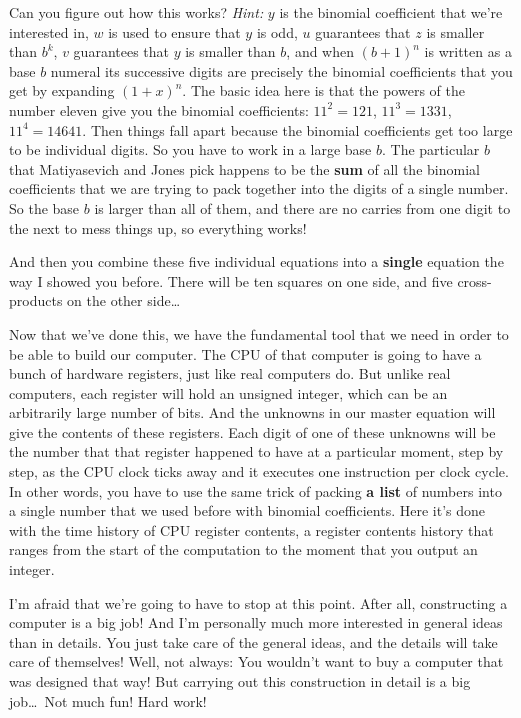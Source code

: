 \documentclass[12pt]{book}
\begin{document}
Can you figure out how this works? 
\emph{Hint:} $y$ is the binomial coefficient that we're interested in, 
$w$ is used to ensure that $y$ is odd,
$u$ guarantees that $z$ is smaller than $b^k$, $v$ guarantees that $y$ is smaller than $b$,
and when $(b+1)^n$ is written as a base $b$ numeral its
successive digits are precisely the binomial coefficients that you get by expanding
$(1+x)^n$.
The basic idea here is that the powers of the number eleven
give you the binomial coefficients: $11^2 = 121$, $11^3 = 1331$,
$11^4 = 14641$. Then things fall apart because the binomial coefficients get too large
to be individual digits. So you have to work in a large base $b$.  The particular $b$ that
Matiyasevich and Jones pick happens to be the \textbf{sum} of all the binomial coefficients that  
we are trying to pack together into the digits of a single number.
So the base $b$ is larger than all of them,
and there are no carries from one digit to the next to mess things up,
so everything works!
 
And then you combine these five individual equations 
into a \textbf{single} equation the way I showed you before.
There will be ten squares on one side, and five cross-products on the other side\ldots
 
Now that we've done this, we have the fundamental tool that we need in order to be able
to build our computer.
The CPU of that computer is going to have a bunch of hardware registers, just like real
computers do.  But unlike real computers, each register will hold an unsigned integer,
which can be an arbitrarily large number of bits.
And the unknowns in our master equation will give the contents of these registers.
Each digit of one of these unknowns will be the number that that register
happened to have at a particular moment, step by step, as the CPU clock ticks away and
it executes one instruction per clock cycle.
In other words, you have to use the same trick of packing \textbf{a list} of numbers into
a single number that we used before with binomial coefficients. Here it's done with the time
history of CPU register contents, 
a register contents history that ranges
from the start of the computation to the moment that you output an integer.
 
I'm afraid that we're going to have to stop at this point.
After all, constructing a computer is a big job!
And I'm personally much more interested in general ideas than in details.
You just take care of the general ideas, and the details will take care of themselves!
Well, not always: You wouldn't want to buy a computer that was designed that way!
But carrying out this construction in detail is a big job\ldots\
Not much fun! Hard work!  
 
\end{document}
